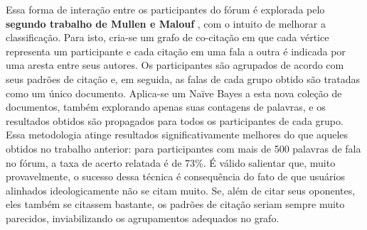 

Essa forma de interação entre os participantes do fórum é explorada pelo \textbf{segundo trabalho de Mullen e Malouf} \cite{malouf-taking_sides}, com o intuito de melhorar a classificação. Para isto, cria-se um grafo de co-citação em que cada vértice representa um participante e cada citação em uma fala a outra é indicada por uma aresta entre seus autores. Os participantes são agrupados de acordo com seus padrões de citação e, em seguida, as falas de cada grupo obtido são tratadas como um único documento. Aplica-se um Naïve Bayes a esta nova coleção de documentos, também explorando apenas suas contagens de palavras, e os resultados obtidos são propagados para todos os participantes de cada grupo. Essa metodologia atinge resultados significativamente melhores do que aqueles obtidos no trabalho anterior: para participantes com mais de 500 palavras de fala no fórum, a taxa de acerto relatada é de 73\%. É válido salientar que, muito provavelmente, o sucesso dessa técnica é consequência do fato de que usuários alinhados ideologicamente não se citam muito. Se, além de citar seus oponentes, eles também se citassem bastante, os padrões de citação seriam sempre muito parecidos, inviabilizando os agrupamentos adequados no grafo.


